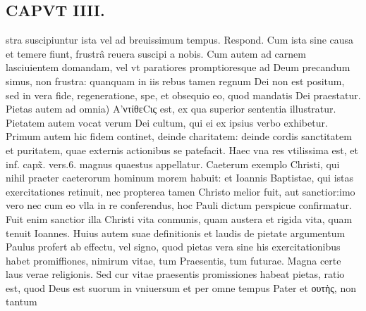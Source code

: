 \documentclass{article}
\begin{document}
\begin{pages}
\section*{CAPVT  IIII. }
\marginpar{[ p.211 ]}\pstart stra suscipiuntur ista vel ad breuissimum tempus. Respond. Cum ista sine causa et temere fiunt, frustrâ reuera suscipi a nobis. Cum autem ad carnem lasciuientem domandam, vel vt paratiores promptioresque ad Deum precandum simus, non frustra: quanquam in iis rebus tamen regnum Dei non est positum, sed in vera fide, regeneratione, spe, et obsequio eo, quod mandatis Dei praestatur. Pietas autem ad omnia) Α'ντίθεCις est, ex qua superior sententia illustratur. Pietatem autem vocat verum Dei cultum, qui ei ex ipsius verbo exhibetur. Primum autem hic fidem continet, deinde charitatem: deinde cordis sanctitatem et puritatem, quae externis actionibus se patefacit. Haec vna res vtilissima est, et inf. capx̃. vers.6. magnus quaestus appellatur. Caeterum exemplo Christi, qui nihil praeter caeterorum hominum morem habuit: et Ioannis Baptistae, qui istas exercitationes retinuit, nec propterea tamen Christo melior fuit, aut sanctior:imo vero nec cum eo vlla in re conferendus, hoc Pauli dictum perspicue confirmatur. Fuit enim sanctior illa Christi vita conmunis, quam austera et rigida vita, quam tenuit Ioannes. Huius autem suae definitionis et laudis de pietate argumentum Paulus profert ab effectu, vel signo, quod pietas vera sine his exercitationibus habet promiffiones, nimirum vitae, tum Praesentis, tum futurae. Magna certe laus verae religionis. Sed cur vitae praesentis promissiones habeat pietas, ratio est, quod Deus est suorum in vniuersum et per omne tempus Pater et ουτὴς, non tantum  \pend

\end{pages}
\end{document}
